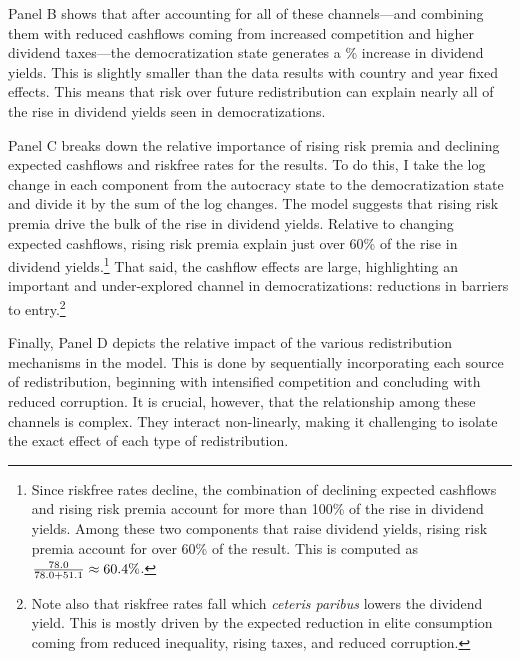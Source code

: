 \documentclass[12pt]{article}
\numberwithin{equation}{section}
\begin{document}
Panel B shows that after accounting for all of these channels---and combining them with reduced cashflows coming from increased competition and higher dividend taxes---the democratization state generates a \tabTwelveDYChangeModel\% increase in dividend yields. This is slightly smaller than the data results with country and year fixed effects. This means that risk over future redistribution can explain nearly all of the rise in dividend yields seen in democratizations. 

Panel C breaks down the relative importance of rising risk premia and declining expected cashflows and riskfree rates for the results. To do this, I take the log change in each component from the autocracy state to the democratization state and divide it by the sum of the log changes. The model suggests that rising risk premia drive the bulk of the rise in dividend yields. Relative to changing expected cashflows, rising risk premia explain just over 60\% of the rise in dividend yields.\footnote{Since riskfree rates decline, the combination of declining expected cashflows and rising risk premia account for more than 100\% of the rise in dividend yields. Among these two components that raise dividend yields, rising risk premia account for over 60\% of the result. This is computed as $\frac{78.0}{78.0 + 51.1} \approx 60.4\%$.} That said, the cashflow effects are large, highlighting an important and under-explored channel in democratizations: reductions in barriers to entry.\footnote{Note also that riskfree rates fall which {\it ceteris paribus} lowers the dividend yield. This is mostly driven by the expected reduction in elite consumption coming from reduced inequality, rising taxes, and reduced corruption.}\label{footnote:clarify_effect}

Finally, Panel D depicts the relative impact of the various redistribution mechanisms in the model. This is done by sequentially incorporating each source of redistribution, beginning with intensified competition and concluding with reduced corruption. It is crucial, however, that the relationship among these channels is complex. They interact non-linearly, making it challenging to isolate the exact effect of each type of redistribution.
\end{document}
